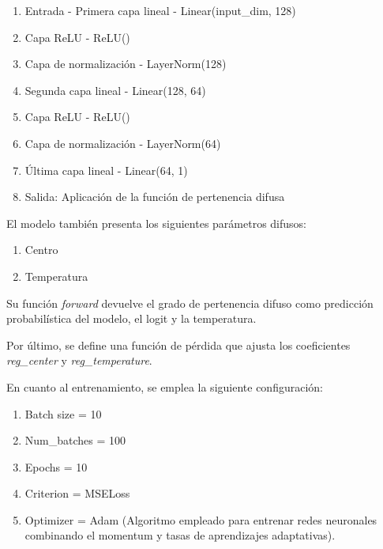 \begin{enumerate}
 \item Entrada - Primera capa lineal - Linear(input\_dim, 128)
 \item Capa ReLU - ReLU()
 \item Capa de normalización - LayerNorm(128)
 \item Segunda capa lineal - Linear(128, 64)
 \item Capa ReLU - ReLU()
 \item Capa de normalización - LayerNorm(64)
 \item Última capa lineal - Linear(64, 1)
 \item Salida: Aplicación de la función de pertenencia difusa
\end{enumerate}

El modelo también presenta los siguientes parámetros difusos:

\begin{enumerate}
 \item Centro
 \item Temperatura
\end{enumerate}

Su función \textit{forward} devuelve el grado de pertenencia difuso como predicción probabilística del modelo, el logit y la temperatura.

Por último, se define una función de pérdida que ajusta los coeficientes \textit{reg\_center} y \textit{reg\_temperature}.

En cuanto al entrenamiento, se emplea la siguiente configuración:

\begin{enumerate}
 \item Batch size = 10
 \item Num\_batches = 100
 \item Epochs = 10
 \item Criterion = MSELoss
 \item Optimizer = Adam (Algoritmo empleado para entrenar redes neuronales combinando el momentum y tasas de aprendizajes adaptativas).
\end{enumerate}